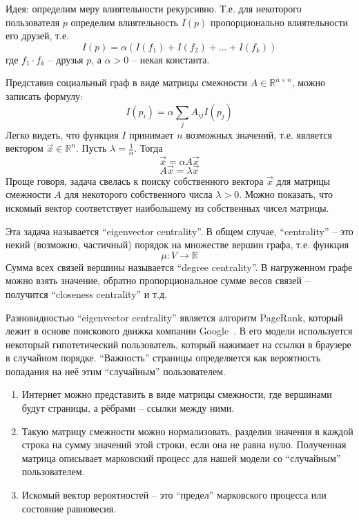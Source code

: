 \documentclass[a4paper,11pt]{article}
\begin{document}
Идея: определим меру влиятельности рекурсивно. Т.е. для некоторого пользователя
$p$ определим влиятельность $I(p)$ пропорционально влиятельности его друзей, т.е.
\begin{equation*}
  I(p) = \alpha (I(f_1) + I(f_2) + \ldots + I(f_k))
\end{equation*}
где $f_1 \cdot f_k$ -- друзья $p$, а $\alpha > 0$ -- некая константа.

Представив социальный граф в виде матрицы смежности 
$A \in \mathbb{R}^{n \times n}$, можно записать формулу:
\begin{equation*}
  I(p_i) = \alpha \sum_{j} A_{ij} I(p_j)
\end{equation*}
Легко видеть, что функция $I$ принимает $n$ возможных значений, т.е. является
вектором $\vec{x} \in \mathbb{R}^n$. Пусть $\lambda = \frac{1}{\alpha}$. Тогда
\begin{equation*}
  \vec{x} = \alpha A \vec{x}
\end{equation*}
\begin{equation*}
  A \vec{x} = \lambda \vec{x}
\end{equation*}
Проще говоря, задача свелась к поиску собственного вектора $\vec{x}$ для матрицы
смежности $A$ для некоторого собственного числа $\lambda > 0$. Можно показать,
что искомый вектор соответствует наибольшему из собственных чисел матрицы.

Эта задача называется ``eigenvector centrality''. В общем случае, ``centrality''
-- это некий (возможно, частичный) порядок на множестве вершин графа, т.е.
функция 
\begin{equation*}
  \mu: V \rightarrow \mathbb{R}
\end{equation*}
Сумма всех связей вершины называется ``degree centrality''. В нагруженном
графе можно взять значение, обратно пропорциональное сумме весов связей --
получится ``closeness centrality'' и т.д.

Разновидностью ``eigenvector centrality'' является алгоритм PageRank,
который лежит в основе поискового движка компании 
Google~\cite{Page99thepagerank}. В его модели используется некоторый 
гипотетический пользователь, который нажимает на ссылки в браузере в 
случайном порядке. ``Важность'' страницы определяется как вероятность попадания
на неё этим ``случайным'' пользователем.
\begin{enumerate}
\item Интернет можно представить в виде матрицы смежности, где вершинами
  будут страницы, а рёбрами -- ссылки между ними.
\item Такую матрицу смежности можно нормализовать, разделив значения в
  каждой строка на сумму значений этой строки, если она не равна нулю.
  Полученная матрица описывает марковский процесс для нашей модели
  со ``случайным'' пользователем.
\item Искомый вектор вероятностей -- это ``предел'' марковского процесса
  или состояние равновесия.
\end{enumerate}
\end{document}
